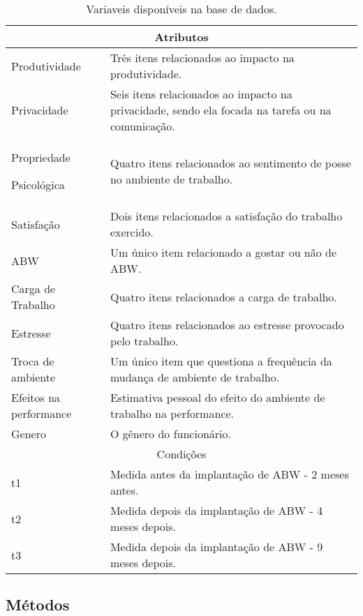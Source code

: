 \documentclass[kdmile,a4paper]{kdmile} %
\begin{document}
\begin{table}[h!]
\centering
\begin{tabular}{ |p{3cm}|p{9cm}|  }
 \hline
 \multicolumn{2}{|c|}{Atributos} \\
 \hline
 \footnotesize{Produtividade}& \footnotesize{Três itens relacionados ao impacto na produtividade.}\\
 \hline
\footnotesize{Privacidade}& \footnotesize{Seis itens relacionados ao impacto na privacidade, sendo ela focada na tarefa ou na comunicação.}\\
 \hline
\footnotesize{Propriedade 

Psicológica}& \footnotesize{Quatro itens relacionados ao sentimento de posse no ambiente de trabalho.}\\
 \hline
 \footnotesize{Satisfação}& \footnotesize{Dois itens relacionados a satisfação do trabalho exercido.}\\
 \hline
 \footnotesize{ABW}& \footnotesize{Um único item relacionado a gostar ou não de ABW.}\\
 \hline
 \footnotesize{Carga de Trabalho}& \footnotesize{Quatro itens relacionados a carga de trabalho.}\\
 \hline
  \footnotesize{Estresse}& \footnotesize{Quatro itens relacionados ao estresse provocado pelo trabalho.}\\
 \hline
 \footnotesize{Troca de ambiente}& \footnotesize{Um único item que questiona a frequência da mudança de ambiente de trabalho.}\\
 \hline
 \footnotesize{Efeitos na performance}& \footnotesize{Estimativa pessoal do efeito do ambiente de trabalho na performance.}\\
 \hline
 \footnotesize{Genero}& \footnotesize{O gênero do funcionário.}\\
 \hline
 \multicolumn{2}{|c|}{Condições} \\
 \hline
 \footnotesize{t1}& \footnotesize{Medida antes da implantação de ABW - 2 meses antes.}\\
 \hline
  \footnotesize{t2}& \footnotesize{Medida depois da implantação de ABW - 4 meses depois.}\\
 \hline
  \footnotesize{t3}& \footnotesize{Medida depois da implantação de ABW - 9 meses depois.}\\
 \hline
\end{tabular}
\caption{Variaveis disponíveis na base de dados.}
\label{table:Table I}
\end{table}

\subsection{Métodos}
\end{document}
